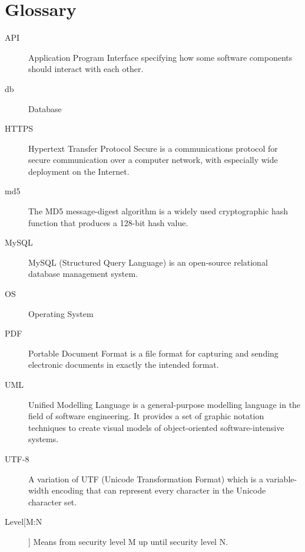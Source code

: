 \documentclass[10pt,a4paper]{article}
\begin{document}
\section{Glossary}
\begin{description}
	\item[API] Application Program Interface specifying how some software components should interact with each other.
	\item[db] Database
	\item[HTTPS] Hypertext Transfer Protocol Secure is a communications protocol for secure communication over a computer network, with especially wide deployment on the Internet.
	\item[md5] The MD5 message-digest algorithm is a widely used cryptographic hash function that produces a 128-bit hash value.
	\item[MySQL] MySQL (Structured Query Language) is an open-source relational database management system.
	\item[OS] Operating System
	\item[PDF] Portable Document Format is a file format for capturing and sending electronic documents in exactly the intended format.
	\item[UML] Unified Modelling Language is a general-purpose modelling language in the field of software engineering. It provides a set of graphic notation techniques to create visual models of object-oriented software-intensive systems. 
	\item[UTF-8] A variation of UTF (Unicode Transformation Format) which is a variable-width encoding that can represent every character in the Unicode character set.
	\pagebreak
	\begin{center}

	\end{center}
	\item[Level[M:N]] Means from security level M up until security level N.
		
\end{description}
\end{document}
